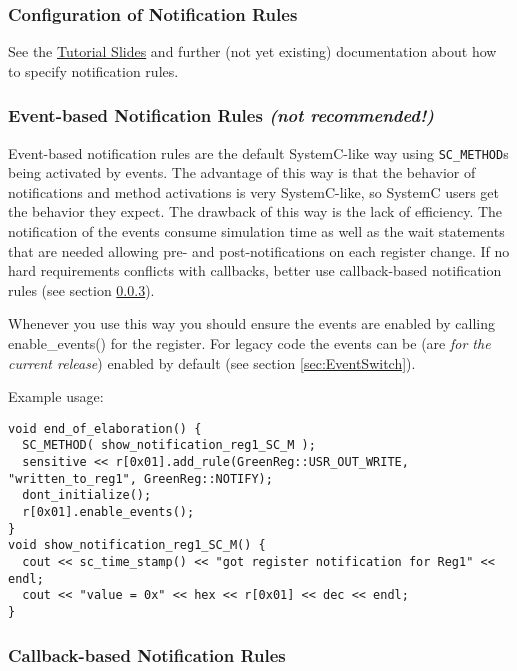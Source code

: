 \subsubsection{Configuration of Notification Rules}
\label{sec:NotificationRuleConfiguration}

See the \hyperlink{lnk:TutorialSlides}{Tutorial Slides} and further (not yet existing) documentation about how to specify notification rules.

\subsubsection{Event-based Notification Rules {\em (not recommended!)}}
\label{sec:EventNotificationRules}

Event-based notification rules are the default SystemC-like way using \lstinline|SC_METHOD|s being activated by events. The advantage of this way is that the behavior of notifications and method activations is very SystemC-like, so SystemC users get the behavior they expect. The drawback of this way is the lack of efficiency. The notification of the events consume simulation time as well as the {\sffamily wait} statements that are needed allowing pre- and post-notifications on each register change. If no hard requirements conflicts with callbacks, better use callback-based notification rules (see section \ref{sec:CallbackNotificationRules}). 

Whenever you use this way you should ensure the events are enabled by calling {\sffamily enable\_events()} for the register. For legacy code the events can be (are {\em for the current release}) enabled by default (see section \ref{sec:EventSwitch}).

Example usage: 

\noindent
\begin{minipage}{\textwidth}
\begin{lstlisting}
void end_of_elaboration() {
  SC_METHOD( show_notification_reg1_SC_M );
  sensitive << r[0x01].add_rule(GreenReg::USR_OUT_WRITE, "written_to_reg1", GreenReg::NOTIFY);
  dont_initialize();
  r[0x01].enable_events();
}
void show_notification_reg1_SC_M() {
  cout << sc_time_stamp() << "got register notification for Reg1" << endl;
  cout << "value = 0x" << hex << r[0x01] << dec << endl;
}
\end{lstlisting}
\end{minipage}

\subsubsection{Callback-based Notification Rules}
\label{sec:CallbackNotificationRules}

